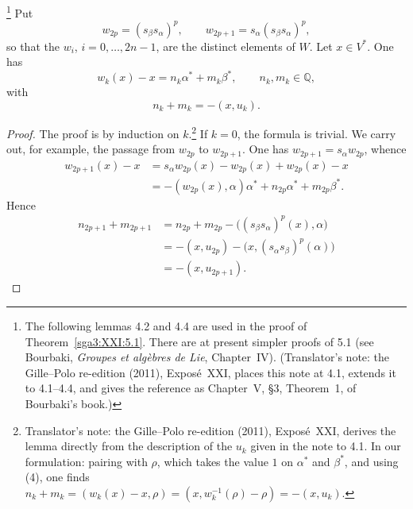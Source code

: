 \begin{lemma}\label{sga3:XXI:4.2}\footnote{The following lemmas 4.2 and 4.4 are used in the
proof of Theorem~\ref{sga3:XXI:5.1}. There are at present simpler proofs of 5.1 (see
Bourbaki, \emph{Groupes et algèbres de Lie}, Chapter~IV). (Translator's note: the
Gille--Polo re-edition (2011), Exposé~XXI, places this note at 4.1, extends it to 4.1--4.4,
and gives the reference as Chapter~V, \S3, Theorem~1, of Bourbaki's book.)}
Put
\[
 w_{2p}=(s_\beta s_\alpha)^p,
 \qquad
 w_{2p+1}=s_\alpha(s_\beta s_\alpha)^p,
\]
so that the \(w_i\), \(i=0,\ldots,2n-1\), are the distinct elements of
\(W\). Let \(x\in V^\ast\). One has
\[
 w_k(x)-x=n_k\alpha^\ast+m_k\beta^\ast,
 \qquad n_k,m_k\in\mathbb Q,
\]
with
\[
 n_k+m_k=-(x,u_k).
\]
\end{lemma}

\begin{proof}
The proof is by induction on \(k\).\footnote{Translator's note: the Gille--Polo re-edition (2011), Exposé~XXI, derives the lemma
directly from the description of the \(u_k\) given in the note to 4.1. In our
formulation: pairing with \(\rho\), which takes the value \(1\) on \(\alpha^\ast\) and
\(\beta^\ast\), and using (4), one finds
\(n_k+m_k=(w_k(x)-x,\rho)=(x,w_k^{-1}(\rho)-\rho)=-(x,u_k)\).} If \(k=0\), the formula is
trivial. We carry out, for example, the passage from \(w_{2p}\) to
\(w_{2p+1}\). One has \(w_{2p+1}=s_\alpha w_{2p}\), whence
\[
\begin{aligned}
w_{2p+1}(x)-x
 &=s_\alpha w_{2p}(x)-w_{2p}(x)+w_{2p}(x)-x\\
 &=-(w_{2p}(x),\alpha)\alpha^\ast+n_{2p}\alpha^\ast+m_{2p}\beta^\ast.
\end{aligned}
\]
Hence
\[
\begin{aligned}
n_{2p+1}+m_{2p+1}
 &=n_{2p}+m_{2p}
   -\bigl((s_\beta s_\alpha)^p(x),\alpha\bigr)\\
 &=-(x,u_{2p})-\bigl(x,(s_\alpha s_\beta)^p(\alpha)\bigr)\\
 &=-(x,u_{2p+1}).
\end{aligned}
\]
\end{proof}
